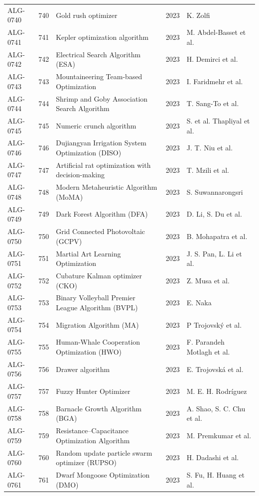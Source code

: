 \documentclass[8pt]{article}
\begin{document}
\begin{landscape}
\begin{longtable}{P{1.7cm}rP{10.0cm}rP{7.2cm}}
ALG-0740 & 740 & Gold rush optimizer & 2023 & K. Zolfi \\
ALG-0741 & 741 & Kepler optimization algorithm & 2023 & M. Abdel-Basset et al. \\
ALG-0742 & 742 & Electrical Search Algorithm (ESA) & 2023 & H. Demirci et al. \\
ALG-0743 & 743 & Mountaineering Team-based Optimization & 2023 & I. Faridmehr et al. \\
ALG-0744 & 744 & Shrimp and Goby Association Search Algorithm & 2023 & T. Sang-To et al. \\
ALG-0745 & 745 & Numeric crunch algorithm & 2023 & S. et al. Thapliyal et al. \\
ALG-0746 & 746 & Dujiangyan Irrigation System Optimization (DISO) & 2023 & J. T. Niu et al. \\
ALG-0747 & 747 & Artificial rat optimization with decision-making & 2023 & T. Mzili et al. \\
ALG-0748 & 748 & Modern Metaheuristic Algorithm (MoMA) & 2023 & S. Suwannarongsri \\
ALG-0749 & 749 & Dark Forest Algorithm (DFA) & 2023 & D. Li, S. Du et al. \\
ALG-0750 & 750 & Grid Connected Photovoltaic (GCPV) & 2023 & B. Mohapatra et al. \\
ALG-0751 & 751 & Martial Art Learning Optimization & 2023 & J. S. Pan, L. Li et al. \\
ALG-0752 & 752 & Cubature Kalman optimizer (CKO) & 2023 & Z. Musa et al. \\
ALG-0753 & 753 & Binary Volleyball Premier League Algorithm (BVPL) & 2023 & E. Naka \\
ALG-0754 & 754 & Migration Algorithm (MA) & 2023 & P Trojovský et al. \\
ALG-0755 & 755 & Human-Whale Cooperation Optimization (HWO) & 2023 & F. Parandeh Motlagh et al. \\
ALG-0756 & 756 & Drawer algorithm & 2023 & E. Trojovská et al. \\
ALG-0757 & 757 & Fuzzy Hunter Optimizer & 2023 & M. E. H. Rodríguez \\
ALG-0758 & 758 & Barnacle Growth Algorithm (BGA) & 2023 & A. Shao, S. C. Chu et al. \\
ALG-0759 & 759 & Resistance–Capacitance Optimization Algorithm & 2023 & M. Premkumar et al. \\
ALG-0760 & 760 & Random update particle swarm optimizer (RUPSO) & 2023 & H. Dadashi et al. \\
ALG-0761 & 761 & Dwarf Mongoose Optimization (DMO) & 2023 & S. Fu, H. Huang et al. \\

\end{longtable}
\end{landscape}
\end{document}
